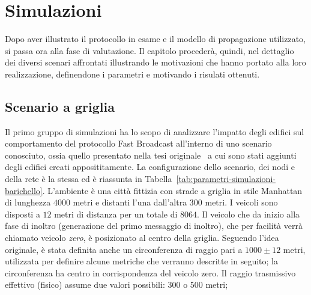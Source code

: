 
\chapter{Simulazioni}\label{chap:simulazioni}
Dopo aver illustrato il protocollo in esame e il modello di propagazione utilizzato, si passa ora alla fase di valutazione.
Il capitolo procederà, quindi, nel dettaglio dei diversi scenari affrontati illustrando
le motivazioni che hanno portato alla loro realizzazione, definendone i parametri e motivando i risulati ottenuti.
%
\section{Scenario a griglia}\label{sec:configurazione-griglia}
Il primo gruppo di simulazioni ha lo scopo di analizzare l'impatto degli edifici sul comportamento del protocollo
Fast Broadcast all'interno di uno scenario conosciuto, ossia quello presentato nella tesi originale~\cite{Barichello2017propagazione}
a cui sono stati aggiunti degli edifici creati apposititamente.
La configurazione dello scenario, dei nodi e della rete è la stessa ed è riassunta in Tabella~\ref{tab:parametri-simulazioni-barichello}.
L'ambiente è una città fittizia con strade a griglia in stile Manhattan di lunghezza $4000$ metri e distanti l'una dall'altra $300$ metri.
I veicoli sono disposti a $12$ metri di distanza per un totale di $8064$.
Il veicolo che da inizio alla fase di inoltro (generazione del primo messaggio di inoltro),
che per facilità verrà chiamato veicolo \textit{zero}, è posizionato al centro della griglia.
Seguendo l'idea originale, è stata definita anche un circonferenza di raggio pari a $1000\pm12$ metri, utilizzata per definire alcune metriche che verranno descritte in seguito;
la circonferenza ha centro in corrispondenza del veicolo zero.
Il raggio trasmissivo effettivo (fisico) assume due valori possibili: $300$ o $500$ metri;
%
